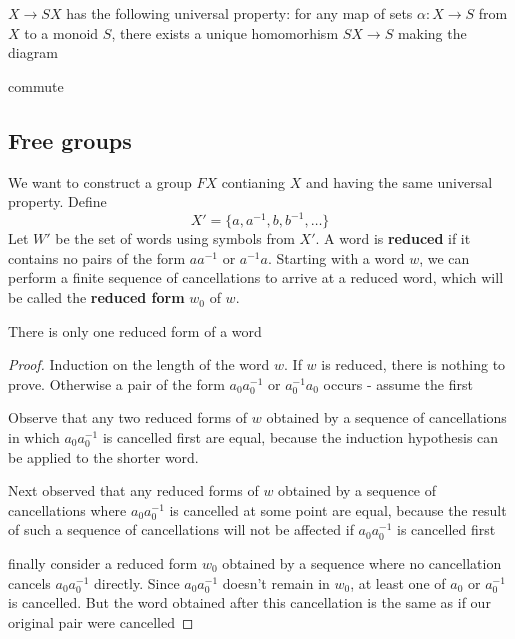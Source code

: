 \documentclass[11pt]{article}
\begin{document}
\(X\to SX\) has the following universal property: for any map of sets \(\alpha:X\to S\) from \(X\) to a
monoid \(S\), there exists a unique homomorhism \(SX\to S\) making the diagram
\begin{center}\end{center}
commute
\subsection{Free groups}
\label{sec:org1b5fd4a}
We want to construct a group \(FX\) contianing \(X\) and having the same universal property.
Define
\begin{equation*}
X'=\{a,a^{-1},b,b^{-1},\dots\}
\end{equation*}
Let \(W'\) be the set of words using symbols from \(X'\). A word is \textbf{reduced} if it contains no
pairs of the form \(aa^{-1}\) or \(a^{-1}a\). Starting with a word \(w\), we can perform a
finite sequence of cancellations to arrive at a reduced word, which will be called the \textbf{reduced
form} \(w_0\) of \(w\).

\begin{proposition}[]
There is only one reduced form of a word
\end{proposition}

\begin{proof}
Induction on the length of the word \(w\). If \(w\) is reduced, there is nothing to prove.
Otherwise a pair of the form \(a_0a_0^{-1}\) or \(a_0^{-1}a_0\) occurs - assume the first

Observe that any two reduced forms of \(w\) obtained by a sequence of cancellations in
which \(a_0a_0^{-1}\) is cancelled first are equal, because the induction hypothesis can be
applied to the shorter word.

Next observed that any reduced forms of \(w\) obtained by a sequence of cancellations
where \(a_0a_0^{-1}\) is cancelled at some point are equal, because the result of such a
sequence of cancellations will not be affected if \(a_0a_0^{-1}\) is cancelled first

finally consider a reduced form \(w_0\) obtained by a sequence where no cancellation
cancels \(a_0a_0^{-1}\) directly. Since \(a_0a_0^{-1}\) doesn't remain in \(w_0\), at least one
of \(a_0\) or \(a_0^{-1}\) is cancelled. But the word obtained after this cancellation is the
same as if our original pair were cancelled
\end{proof}
\end{document}
